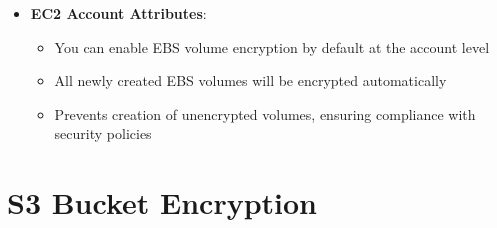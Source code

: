 \documentclass[11pt,a4paper]{report}
\begin{document}
\begin{itemize}
  \item \textbf{EC2 Account Attributes}:
\begin{itemize}
  \item You can enable EBS volume encryption by default at the account level
  \item All newly created EBS volumes will be encrypted automatically
  \item Prevents creation of unencrypted volumes, ensuring compliance with security policies
\end{itemize}
\end{itemize}


\section{S3 Bucket Encryption}
\end{document}
